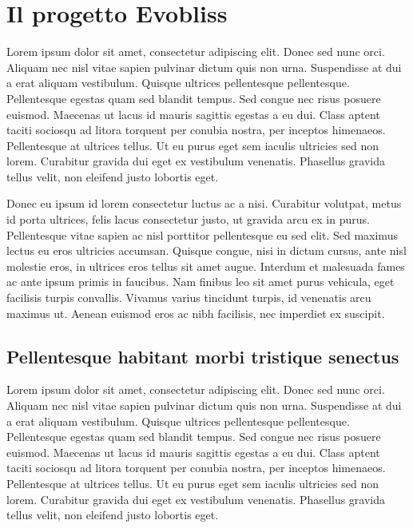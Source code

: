 
\chapter{Il progetto Evobliss }
\vspace{0.5cm}
\label{cha:intro}
Lorem ipsum dolor sit amet, consectetur adipiscing elit. Donec sed nunc orci. Aliquam nec nisl vitae sapien pulvinar dictum quis non urna. Suspendisse at dui a erat aliquam vestibulum. Quisque ultrices pellentesque pellentesque. Pellentesque egestas quam sed blandit tempus. Sed congue nec risus posuere euismod. Maecenas ut lacus id mauris sagittis egestas a eu dui. Class aptent taciti sociosqu ad litora torquent per conubia nostra, per inceptos himenaeos. Pellentesque at ultrices tellus. Ut eu purus eget sem iaculis ultricies sed non lorem. Curabitur gravida dui eget ex vestibulum venenatis. Phasellus gravida tellus velit, non eleifend justo lobortis eget. 
\cite{coulouris}

Donec eu ipsum id lorem consectetur luctus ac a nisi. Curabitur volutpat, metus id porta ultrices, felis lacus consectetur justo, ut gravida arcu ex in purus. Pellentesque vitae sapien ac nisl porttitor pellentesque eu sed elit. Sed maximus lectus eu eros ultricies accumsan. Quisque congue, nisi in dictum cursus, ante nisl molestie eros, in ultrices eros tellus sit amet augue. Interdum et malesuada fames ac ante ipsum primis in faucibus. Nam finibus leo sit amet purus vehicula, eget facilisis turpis convallis. Vivamus varius tincidunt turpis, id venenatis arcu maximus ut. Aenean euismod eros ac nibh facilisis, nec imperdiet ex suscipit.
\cite{dalal}


\section{Pellentesque habitant morbi tristique senectus}
\label{sec:context}

Lorem ipsum dolor sit amet, consectetur adipiscing elit. Donec sed nunc orci. Aliquam nec nisl vitae sapien pulvinar dictum quis non urna. Suspendisse at dui a erat aliquam vestibulum. Quisque ultrices pellentesque pellentesque. Pellentesque egestas quam sed blandit tempus. Sed congue nec risus posuere euismod. Maecenas ut lacus id mauris sagittis egestas a eu dui. Class aptent taciti sociosqu ad litora torquent per conubia nostra, per inceptos himenaeos. Pellentesque at ultrices tellus. Ut eu purus eget sem iaculis ultricies sed non lorem. Curabitur gravida dui eget ex vestibulum venenatis. Phasellus gravida tellus velit, non eleifend justo lobortis eget.
\cite{ictbusiness}
\cite{donoho}

